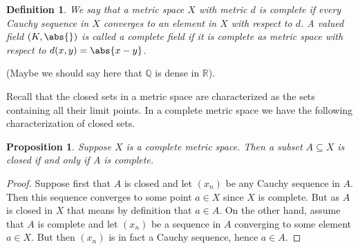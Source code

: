\documentclass{article}
\newtheorem{definition}{Definition}[section]
\newtheorem{proposition}{Proposition}[section]
\newcommand{\mbb}[1]{\mathbb{#1}}
\begin{document}
\begin{definition}
    We say that a metric space $X$ with metric $d$ is complete if every Cauchy sequence in $X$ converges to an element in $X$ with respect to $d$. A valued field $(K, \abs{})$ is called a complete field if it is complete as metric space with respect to $d(x,y) = \abs{x - y}$.
\end{definition}

(Maybe we should say here that $\mbb Q$ is dense in $\mbb R$).

Recall that the closed sets in a metric space are characterized as the sets containing all their limit points. In a complete metric space we have the following characterization of closed sets. 


\begin{proposition}
    Suppose $X$ is a complete metric space. Then a subset $A \subseteq X$ is closed if and only if $A$ is complete.
\end{proposition}
\begin{proof}
    Suppose first that $A$ is closed and let $(x_n)$ be any Cauchy sequence in $A$. Then this sequence converges to some point $a \in X$ since $X$ is complete. But as $A$ is closed in $X$ that means by definition that $a \in A$. On the other hand, assume that $A$ is complete and let $(x_n)$ be a sequence in $A$ converging to some element $a \in X$. But then $(x_n)$ is in fact a Cauchy sequence, hence $a \in A$.  
\end{proof}
\end{document}
